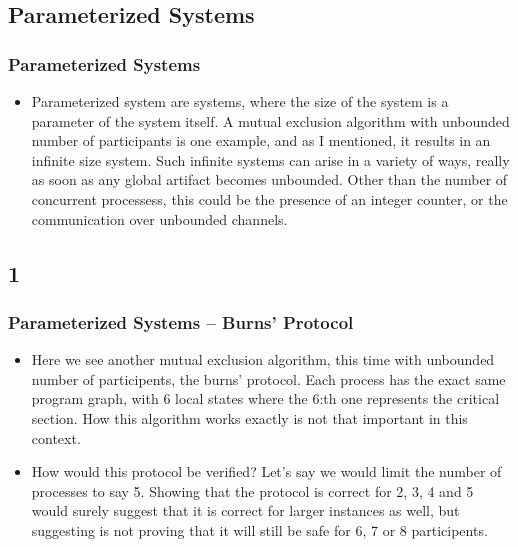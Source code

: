 \documentclass[handout]{beamer}
\begin{document}
\begin{footnotesize}
\subsection{Parameterized Systems}
\begin{frame}
  \frametitle{Parameterized Systems}
  \begin{itemize}
  \item
  Parameterized system are systems, where the size of the system is a parameter of the system itself. A mutual exclusion algorithm with unbounded number of participants is one example, and as I mentioned, it results in an infinite size system. Such infinite systems can arise in a variety of ways, really as soon as any global artifact becomes unbounded. Other than the number of concurrent processess, this could be the presence of an integer counter, or the communication over unbounded channels.

  \end{itemize}
\end{frame}

\subsection*{1}
\begin{frame}
  \frametitle{Parameterized Systems -- Burns' Protocol}
\begin{itemize}
\item
Here we see another mutual exclusion algorithm, this time with unbounded number of participents, the burns' protocol. Each process has the exact same program graph, with 6 local states where the 6:th one represents the critical section. How this algorithm works exactly is not that important in this context.

\item
How would this protocol be verified?
Let's say we would limit the number of processes to say 5. Showing that the protocol is correct for 2, 3, 4 and 5 would surely suggest that it is correct for larger instances as well, but suggesting is not proving that it will still be safe for 6, 7 or 8 participents.


\end{itemize}
\end{frame}



\end{footnotesize}
\end{document}
